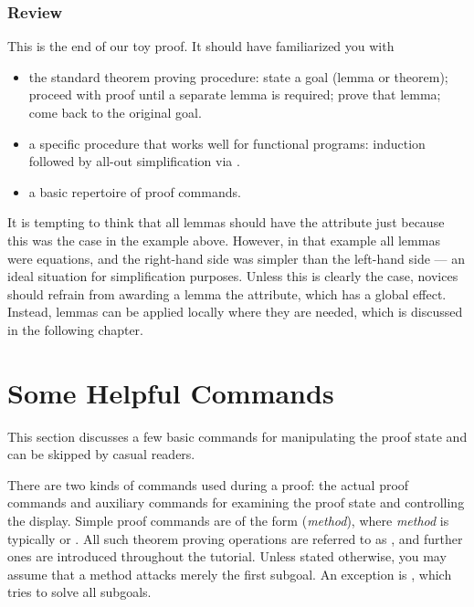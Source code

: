 \subsubsection*{Review}

This is the end of our toy proof. It should have familiarized you with
\begin{itemize}
\item the standard theorem proving procedure:
state a goal (lemma or theorem); proceed with proof until a separate lemma is
required; prove that lemma; come back to the original goal.
\item a specific procedure that works well for functional programs:
induction followed by all-out simplification via .
\item a basic repertoire of proof commands.
\end{itemize}

\begin{warn}
It is tempting to think that all lemmas should have the  attribute
just because this was the case in the example above. However, in that example
all lemmas were equations, and the right-hand side was simpler than the
left-hand side --- an ideal situation for simplification purposes. Unless
this is clearly the case, novices should refrain from awarding a lemma the
 attribute, which has a global effect. Instead, lemmas can be
applied locally where they are needed, which is discussed in the following
chapter.
\end{warn}

\section{Some Helpful Commands}
\label{sec:commands-and-hints}

This section discusses a few basic commands for manipulating the proof state
and can be skipped by casual readers.

There are two kinds of commands used during a proof: the actual proof
commands and auxiliary commands for examining the proof state and controlling
the display. Simple proof commands are of the form
(\textit{method}), where \textit{method} is typically 
 or .  All such theorem proving operations
are referred to as , and further ones are
introduced throughout the tutorial.  Unless stated otherwise, you may
assume that a method attacks merely the first subgoal. An exception is
, which tries to solve all subgoals.

